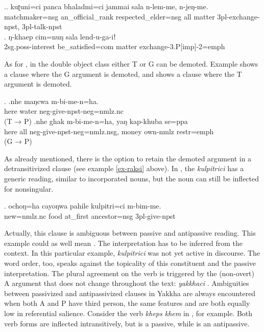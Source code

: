 \ex.\ag. kuʈuni=ci panca bhaladmi=ci jammai sala   n-lem-me, n-jeŋ-me.\\
	matchmaker{\sc =nsg} an\_official\_rank  respected\_elder{\sc =nsg} all matter {\sc 3pl-}exchange{\sc -npst}, {\sc 3pl-}talk{\sc -npst}		\\
	 
\bg. ŋ-khaep cim=nuŋ sala lend-u-ga-iǃ\\
	{\sc 2sg.poss-}interest be\_satisfied{\sc =com} matter exchange{\sc -3.P[imp]-2=emph}\\

\largerpage 
As for , in the double object class  either T or  G can be demoted. Example \Next[a] shows a clause where the G argument is demoted, and \Next[b] shows a clause where the T argument is demoted.  

\ex. \ag.nhe maŋcwa m-bi-me-n=ha.\\
here water {\sc neg-}give{\sc [3sg]-npst-neg=nmlz.nc}	\\
 (T → P)
 \bg.nhe ghak m-bi-me-n=ha, yaŋ kap-khuba se=ppa\\
here all {\sc neg-}give{\sc [3sg]-npst-neg=nmlz.nsg}, money own{\sc -nmlz} {\sc restr=emph} \\
 (G → P)


As already mentioned, there is  the option to retain the demoted argument in a  detransitivized clause (see example \ref{ex-raksi} above). In \Next, the  \emph{kulpitrici} has a generic reading, similar to incorporated nouns, but the noun can still be inflected for nonsingular. 

\exg. ochoŋ=ha cayoŋwa  pahile   kulpitri=ci  m-bim-me.\\
new{\sc =nmlz.nc} food at\_first ancestor{\sc =nsg} {\sc 3pl-}give{\sc -npst}\\

Actually, this clause is ambiguous between passive and antipassive reading. This example could as well mean . The interpretation has to be inferred from the context. In this particular example, \emph{kulpitrici} was not yet active in discourse. The word order, too, speaks against the topicality of this constituent and the passive interpretation. The plural agreement on the verb is triggered by the (non-overt) A argument that does not change throughout the text: \emph{yakkhaci} . Ambiguities between passivized and antipassivized clauses in Yakkha are always encountered when both A and P have third person, the same  features and are both equally low in referential salience. Consider the verb \emph{kheps \ti khem}  in \Next, for example. Both verb forms are inflected intransitively, but \Next[a] is a passive, while \Next[b] is an antipassive.

